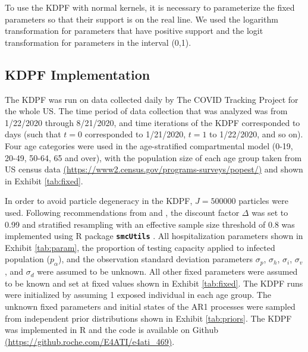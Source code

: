 \documentclass{article}
\begin{document}
To use the KDPF with normal kernels, it is necessary to parameterize the fixed parameters so that their support is on the real line. We used the logarithm transformation for parameters that have positive support and the logit transformation for parameters in the interval (0,1).

\subsection{KDPF Implementation \label{sec:imp}}

The KDPF was run on data collected daily by The COVID Tracking Project for the whole US. The time period of data collection that was analyzed was from 1/22/2020 through 8/21/2020, and time iterations of the KDPF corresponded to days (such that $t = 0$ corresponded to 1/21/2020, $t = 1$ to 1/22/2020, and so on). Four age categories were used in the age-stratified compartmental model (0-19, 20-49, 50-64, 65 and over), with the population size of each age group taken from US census data \href{https://www2.census.gov/programs-surveys/popest/}{(https://www2.census.gov/programs-surveys/popest/)} and shown in Exhibit \ref{tab:fixed}.

In order to avoid particle degeneracy in the KDPF, $J = 500000$ particles were used. Following recommendations from \citet{Liu:West:comb:2001} and \citet{Sheinson:2014}, the discount factor $\Delta$ was set to 0.99 and stratified resampling with an effective sample size threshold of 0.8 was implemented using R package \textbf{\texttt{smcUtils}} \citep{smcUtils}. All hospitalization parameters shown in Exhibit \ref{tab:param}, the proportion of testing capacity applied to infected population ($p_\alpha$), and the observation standard deviation parameters $\sigma_p$, $\sigma_h$, $\sigma_i$, $\sigma_v$, and $\sigma_d$ were assumed to be unknown. All other fixed parameters were assumed to be known and set at fixed values shown in Exhibit \ref{tab:fixed}. The KDPF runs were initialized by assuming 1 exposed individual in each age group. The unknown fixed parameters and initial states of the AR1 processes were sampled from independent prior distributions shown in Exhibit \ref{tab:priors}. The KDPF was implemented in R and the code is available on Github \href{https://github.roche.com/E4ATI/e4ati_469}{(https://github.roche.com/E4ATI/e4ati\_469)}.
\end{document}
